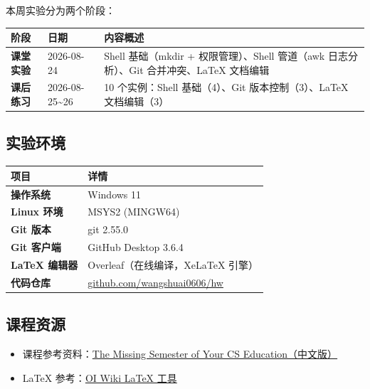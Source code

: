\documentclass[12pt,a4paper]{article}
\begin{document}
本周实验分为两个阶段：

\begin{table}[h]
\centering
\begin{tabularx}{\textwidth}{l l X}
\toprule
\textbf{阶段} & \textbf{日期} & \textbf{内容概述} \\
\midrule
\textbf{课堂实验} & 2026-08-24 & Shell 基础（mkdir + 权限管理）、Shell 管道（awk 日志分析）、Git 合并冲突、LaTeX 文档编辑 \\
\textbf{课后练习} & 2026-08-25\textasciitilde 26 & 10 个实例：Shell 基础（4）、Git 版本控制（3）、LaTeX 文档编辑（3） \\
\bottomrule
\end{tabularx}
\end{table}

\subsection{实验环境}

\begin{table}[h]
\centering
\begin{tabularx}{\textwidth}{>{\bfseries}l X}
\toprule
\textbf{项目} & \textbf{详情} \\
\midrule
操作系统 & Windows 11 \\
Linux 环境 & MSYS2 (MINGW64) \\
Git 版本 & git 2.55.0 \\
Git 客户端 & GitHub Desktop 3.6.4 \\
LaTeX 编辑器 & Overleaf（在线编译，XeLaTeX 引擎） \\
代码仓库 & \href{https://github.com/wangshuai0606/hw}{github.com/wangshuai0606/hw} \\
\bottomrule
\end{tabularx}
\end{table}

\subsection{课程资源}

\begin{itemize}[leftmargin=2em]
    \item 课程参考资料：\href{https://missing-semester-cn.github.io/}{The Missing Semester of Your CS Education（中文版）}
    \item LaTeX 参考：\href{https://oi-wiki.org/tools/latex/}{OI Wiki LaTeX 工具}
\end{itemize}
\end{document}
